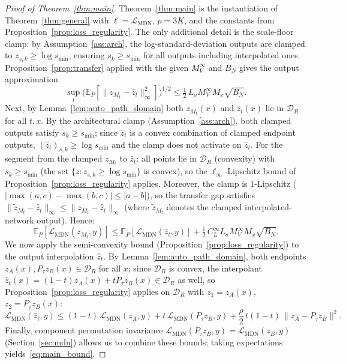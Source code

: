 \documentclass[11pt]{article}
\newcommand{\E}{\mathbb{E}}
\newcommand{\cL}{\mathcal{L}}
\newcommand{\cB}{\mathcal{B}}
\newcommand{\cD}{\mathcal{D}}  %
\begin{document}
\begin{proof}[Proof of Theorem~\ref{thm:main}]
Theorem~\ref{thm:main} is the instantiation of
Theorem~\ref{thm:general} with $\ell = \cL_{\mathrm{MDN}}$,
$p = 3K$, and the constants from
Proposition~\ref{prop:loss_regularity}.
The only additional detail is the scale-floor clamp: by
Assumption~\ref{ass:arch}, the log-standard-deviation outputs are
clamped to $z_{s,k} \ge \log s_{\min}$, ensuring
$s_k \ge s_{\min}$ for all outputs including interpolated ones.
Proposition~\ref{prop:transfer} applied with the given $M_V^\infty$
and $B_N$ gives the output approximation
\[
  \sup_t \bigl(\E_P[\|z_{M_t} - \hat z_t\|_\infty^2]\bigr)^{1/2}
  \le \tfrac{1}{2}\,L_\sigma M_V^\infty M_x \sqrt{B_N}.
\]
Next, by Lemma~\ref{lem:auto_path_domain} both $z_{M_t}(x)$ and
$\hat z_t(x)$ lie in $\cD_R$ for all $t, x$.
By the architectural clamp (Assumption~\ref{ass:arch}), both
clamped outputs satisfy $s_k \ge s_{\min}$; since $\hat z_t$ is a convex
combination of clamped endpoint outputs, $(\hat z_t)_{s,k} \ge
\log s_{\min}$ and the clamp does not activate on $\hat z_t$.
For the segment from the clamped $z_{M_t}$ to $\hat z_t$:
all points lie in $\cD_R$ (convexity) with $s_k \ge s_{\min}$
(the set $\{z : z_{s,k} \ge \log s_{\min}\}$ is convex),
so the $\ell_\infty$-Lipschitz bound of
Proposition~\ref{prop:loss_regularity} applies.
Moreover, the clamp is $1$-Lipschitz
($|\!\max(a,c)-\max(b,c)| \le |a-b|$), so the transfer gap
satisfies $\|\tilde z_{M_t} - \hat z_t\|_\infty
\le \|z_{M_t} - \hat z_t\|_\infty$
(where $\tilde z_{M_t}$ denotes the clamped interpolated-network
output).  Hence:
\[
  \E_P[\cL_{\mathrm{MDN}}(z_{M_t}, y)]
  \le \E_P[\cL_{\mathrm{MDN}}(\hat z_t, y)]
  + \tfrac{1}{2}\,C_L^\infty L_\sigma M_V^\infty M_x \sqrt{B_N}.
\]
We now apply the semi-convexity bound (Proposition~\ref{prop:loss_regularity})
to the output interpolation $\hat z_t$.
By Lemma~\ref{lem:auto_path_domain}, both endpoints
$z_A(x), P_\tau z_B(x) \in \cD_R$ for all $x$;
since $\cD_R$ is convex, the interpolant
$\hat z_t(x) = (1-t)z_A(x) + tP_\tau z_B(x) \in \cD_R$
as well, so Proposition~\ref{prop:loss_regularity} applies on $\cD_R$ with
$z_1 = z_A(x)$, $z_2 = P_\tau z_B(x)$:
\[
  \cL_{\mathrm{MDN}}(\hat z_t, y)
  \le (1-t)\,\cL_{\mathrm{MDN}}(z_A, y)
  + t\,\cL_{\mathrm{MDN}}(P_\tau z_B, y)
  + \frac{\rho}{2}\,t(1-t)\,\|z_A - P_\tau z_B\|^2.
\]
Finally, component permutation invariance
$\cL_{\mathrm{MDN}}(P_\tau z_B, y) = \cL_{\mathrm{MDN}}(z_B, y)$
(Section~\ref{sec:mdn})
allows us to combine these bounds;
taking expectations yields~\eqref{eq:main_bound}.
\end{proof}
\end{document}
